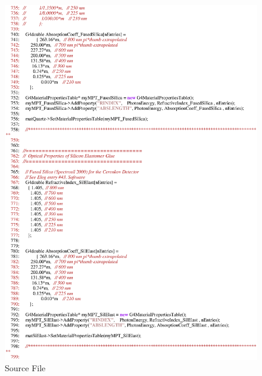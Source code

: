 \begin{figure}[h]
  \hspace{0cm}
  \includegraphics[scale=0.8]{./figures17/QweakSimMaterial.cc-p12.eps}
  \caption{\label{SourceXVII13} Source File}
           \label{fig:XVII-SC-13}
\end{figure}
\clearpage

